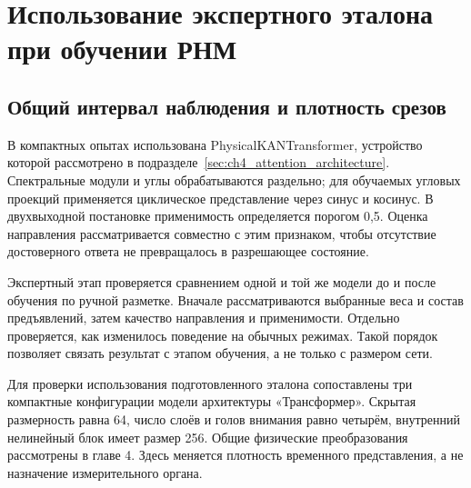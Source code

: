 \section{Использование экспертного эталона при обучении РНМ}
\label{sec:ch5_expert_adaptation}

\subsection{Общий интервал наблюдения и плотность срезов}

{}

В компактных опытах использована PhysicalKANTransformer,
устройство которой рассмотрено в подразделе~\ref{sec:ch4_attention_architecture}.
Спектральные модули и углы обрабатываются раздельно; для обучаемых
угловых проекций применяется циклическое представление через синус
и косинус. В двухвыходной постановке применимость определяется
порогом 0,5. Оценка направления рассматривается совместно с этим
признаком, чтобы отсутствие достоверного ответа не превращалось
в разрешающее состояние.

Экспертный этап проверяется сравнением одной и той же модели
до и после обучения по ручной разметке. Вначале рассматриваются
выбранные веса и состав предъявлений, затем качество направления
и применимости. Отдельно проверяется, как изменилось поведение
на обычных режимах. Такой порядок позволяет связать результат
с этапом обучения, а не только с размером сети.

Для проверки использования подготовленного эталона
сопоставлены три компактные конфигурации модели архитектуры «Трансформер».
Скрытая размерность равна 64, число слоёв и голов внимания
равно четырём, внутренний нелинейный блок имеет размер 256.
Общие физические преобразования рассмотрены в главе 4.
Здесь меняется плотность временного представления,
а не назначение измерительного органа.

